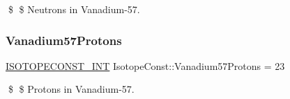 \$ \$ Neutrons in Vanadium-\/57. \mbox{\label{group___isotope_const-_vanadium-_v57_ga8b7d9e7da01a26d4e45ab7acb455c5e7}} 
\subsubsection{\texorpdfstring{Vanadium57\+Protons}{Vanadium57Protons}}
{\footnotesize\ttfamily \mbox{\hyperlink{group___isotope_const-_macros_ga5f18360b3e99483a35c32d789e62621c}{I\+S\+O\+T\+O\+P\+E\+C\+O\+N\+S\+T\+\_\+\+I\+NT}} Isotope\+Const\+::\+Vanadium57\+Protons = 23}

\$ \$ Protons in Vanadium-\/57. 